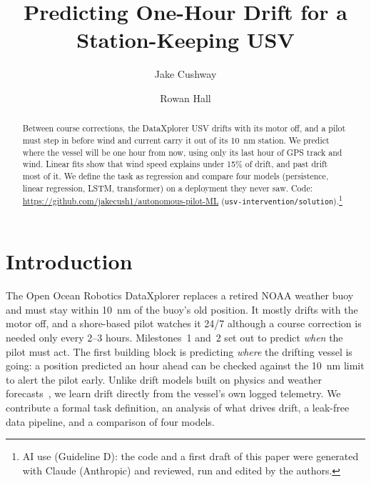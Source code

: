 \documentclass[sigconf]{acmart}
\begin{document}
\title{Predicting One-Hour Drift for a Station-Keeping USV}
\author{Jake Cushway}

\author{Rowan Hall}

\begin{abstract}
Between course corrections, the DataXplorer\texttrademark{} USV drifts with its motor off, and a pilot must step in before wind and current carry it out of its 10~nm station. We predict where the vessel will be one hour from now, using only its last hour of GPS track and wind. Linear fits show that wind speed explains under 15\% of drift, and past drift most of it. We define the task as regression and compare four models (persistence, linear regression, LSTM, transformer) on a deployment they never saw. Code: \url{https://github.com/jakecush1/autonomous-pilot-ML} (\texttt{usv-intervention/solution}).\footnote{AI use (Guideline D): the code and a first draft of this paper were generated with Claude (Anthropic) and reviewed, run and edited by the authors.}
\end{abstract}

\maketitle
\pagestyle{empty}

\section{Introduction}\label{sec:intro}
The Open Ocean Robotics DataXplorer replaces a retired NOAA weather buoy and must stay within 10~nm of the buoy's old position. It mostly drifts with the motor off, and a shore-based pilot watches it 24/7 although a course correction is needed only every 2--3 hours. Milestones~1 and~2 set out to predict \emph{when} the pilot must act. The first building block is predicting \emph{where} the drifting vessel is going: a position predicted an hour ahead can be checked against the 10~nm limit to alert the pilot early. Unlike drift models built on physics and weather forecasts~\cite{dugan2024drifting,song2024drift}, we learn drift directly from the vessel's own logged telemetry. We contribute a formal task definition, an analysis of what drives drift, a leak-free data pipeline, and a comparison of four models.
\end{document}
